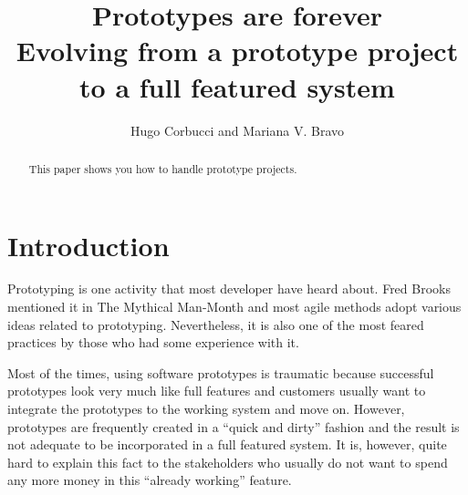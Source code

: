 \documentclass[lnbip]{svmultln}
\begin{document}
%
\mainmatter              %
%
\title{Prototypes are forever\\
  Evolving from a prototype project to a full featured system}
%
%
\author{Hugo Corbucci and Mariana V. Bravo }
%
%
%

\maketitle              %

\begin{abstract}        %

This paper shows you how to handle prototype projects.

\end{abstract}
%
\section{Introduction}

Prototyping is one activity that most developer have heard about. Fred
Brooks mentioned it in The Mythical Man-Month \cite{Brooks1975} and
most agile methods adopt various ideas related to
prototyping. Nevertheless, it is also one of the most feared practices
by those who had some experience with it.

Most of the times, using software prototypes is traumatic because
successful prototypes look very much like full features and customers
usually want to integrate the prototypes to the working system and
move on. However, prototypes are frequently created in a ``quick and
dirty'' fashion and the result is not adequate to be incorporated in a
full featured system. It is, however, quite hard to explain this fact
to the stakeholders who usually do not want to spend any more money in
this ``already working'' feature.
\end{document}
